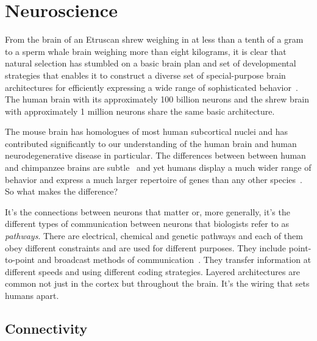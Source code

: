 \documentclass[letterpaper,11pt]{article}
\begin{document}


\section{Neuroscience}
\label{section_neuroscience}


From the brain of an Etruscan shrew weighing in at less than a tenth of a gram to a sperm whale brain weighing more than eight kilograms, it is clear that natural selection has stumbled on a basic brain plan and set of developmental strategies that enables it to construct a diverse set of special-purpose brain architectures for efficiently expressing a wide range of sophisticated behavior~\cite{DouglasandMartinCURRENT-BIOLOGY-12,WillemetBRAIN-SCIENCE-12}. The human brain with its approximately 100 billion neurons and the shrew brain with approximately 1 million neurons share the same basic architecture.

The mouse brain has homologues of most human subcortical nuclei and has contributed significantly to our understanding of the human brain and human neurodegenerative disease in particular. The differences between between human and chimpanzee brains are subtle~\cite{Mora-BermudezetalELIFE-16} and yet humans display a much wider range of behavior and express a much larger repertoire of genes than any other species~\cite{HawrylyczetalNATURE-NEUROSCIENCE-15}. So what makes the difference?

It's the connections between neurons that matter or, more generally, it's the different types of communication between neurons that biologists refer to as {\it{pathways}}. There are electrical, chemical and genetic pathways and each of them obey different constraints and are used for different purposes. They include point-to-point and broadcast methods of communication~\cite{HanetalNATURE-18}. They transfer information at different speeds and using different coding strategies. Layered architectures are common not just in the cortex but throughout the brain. It's the wiring that sets humans apart.


\subsection{Connectivity}
\end{document}
